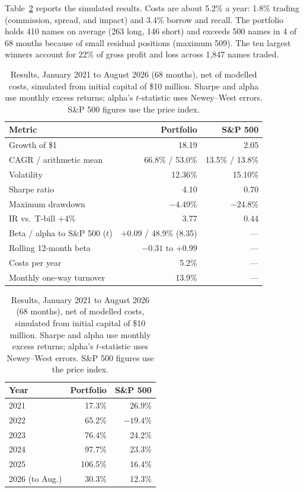 \documentclass[10pt,twocolumn,letterpaper]{article}
\begin{document}
Table~\ref{tab:results} reports the simulated results. Costs are about 5.2\% a year: 1.8\% trading (commission, spread, and impact) and 3.4\% borrow and recall. The portfolio holds 410 names on average (263 long, 146 short) and exceeds 500 names in 4 of 68 months because of small residual positions (maximum 509). The ten largest winners account for 22\% of gross profit and loss across 1,847 names traded.

\begin{table}[t]
\centering
\caption{Results, January 2021 to August 2026 (68 months), net of modelled costs, simulated from initial capital of \$10 million. Sharpe and alpha use monthly excess returns; alpha's $t$-statistic uses Newey--West errors. S\&P 500 figures use the price index.}
\label{tab:results}
\footnotesize
\setlength{\tabcolsep}{5pt}
\begin{tabular}{lrr}
\toprule
Metric & Portfolio & S\&P 500 \\
\midrule
Growth of \$1 & 18.19 & 2.05 \\
CAGR / arithmetic mean & 66.8\% / 53.0\% & 13.5\% / 13.8\% \\
Volatility & 12.36\% & 15.10\% \\
Sharpe ratio & 4.10 & 0.70 \\
Maximum drawdown & $-4.49\%$ & $-24.8\%$ \\
IR vs.\ T-bill $+4\%$ & 3.77 & 0.44 \\
Beta / alpha to S\&P 500 ($t$) & $+0.09$ / 48.9\% (8.35) & --- \\
Rolling 12-month beta & $-0.31$ to $+0.99$ & --- \\
Costs per year & 5.2\% & --- \\
Monthly one-way turnover & 13.9\% & --- \\
\bottomrule
\end{tabular}
\qquad
\begin{tabular}{lrr}
\toprule
Year & Portfolio & S\&P 500 \\
\midrule
2021 & 17.3\% & 26.9\% \\
2022 & 65.2\% & $-19.4\%$ \\
2023 & 76.4\% & 24.2\% \\
2024 & 97.7\% & 23.3\% \\
2025 & 106.5\% & 16.4\% \\
2026 (to Aug.) & 30.3\% & 12.3\% \\
\bottomrule
\end{tabular}
\end{table}
\end{document}

